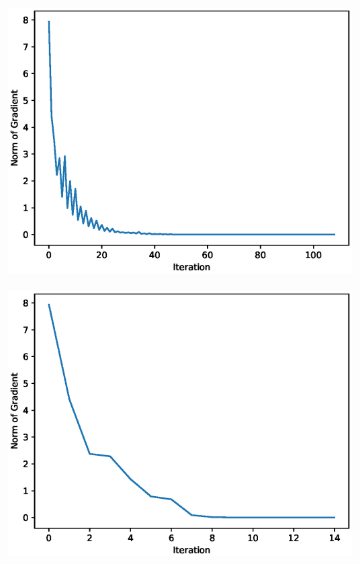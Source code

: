 \begin{figure}[h!]
\begin{subfigure}[t]{0.6\textwidth}
\centering
    \includegraphics[width=\textwidth]{images/python/sd-pA.eps}
\caption{}
\end{subfigure}
\hfill 
\begin{subfigure}[t]{0.6\textwidth}
\centering
    \includegraphics[width=\textwidth]{images/python/sec-pA.eps}
    \caption{}
\end{subfigure}
\hfill
\begin{subfigure}[t]{0.6\textwidth}
\centering

\end{subfigure}
\end{figure}
